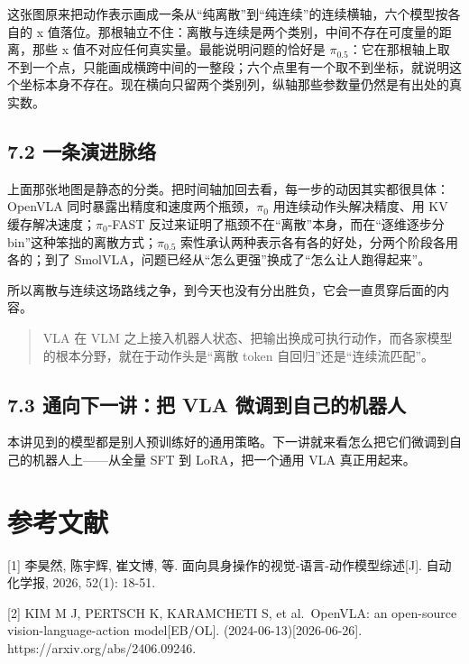 \documentclass[
  chinese,
]{ctexart}
\begin{document}
这张图原来把动作表示画成一条从``纯离散''到``纯连续''的连续横轴，六个模型按各自的
x
值落位。那根轴立不住：离散与连续是两个类别，中间不存在可度量的距离，那些
x 值不对应任何真实量。最能说明问题的恰好是
\(\pi_{0.5}\)：它在那根轴上取不到一个点，只能画成横跨中间的一整段；六个点里有一个取不到坐标，就说明这个坐标本身不存在。现在横向只留两个类别列，纵轴那些参数量仍然是有出处的真实数。

\subsection{7.2
一条演进脉络}\label{ux4e00ux6761ux6f14ux8fdbux8109ux7edc}

上面那张地图是静态的分类。把时间轴加回去看，每一步的动因其实都很具体：OpenVLA
同时暴露出精度和速度两个瓶颈，\(\pi_0\) 用连续动作头解决精度、用 KV
缓存解决速度；\(\pi_0\)-FAST
反过来证明了瓶颈不在``离散''本身，而在``逐维逐步分
bin''这种笨拙的离散方式；\(\pi_{0.5}\)
索性承认两种表示各有各的好处，分两个阶段各用各的；到了
SmolVLA，问题已经从``怎么更强''换成了``怎么让人跑得起来''。

所以离散与连续这场路线之争，到今天也没有分出胜负，它会一直贯穿后面的内容。

\begin{quote}
VLA 在 VLM
之上接入机器人状态、把输出换成可执行动作，而各家模型的根本分野，就在于动作头是``离散
token 自回归''还是``连续流匹配''。
\end{quote}

\subsection{7.3 通向下一讲：把 VLA
微调到自己的机器人}\label{ux901aux5411ux4e0bux4e00ux8bb2ux628a-vla-ux5faeux8c03ux5230ux81eaux5df1ux7684ux673aux5668ux4eba}

本讲见到的模型都是别人预训练好的通用策略。下一讲就来看怎么把它们微调到自己的机器人上------从全量
SFT 到 LoRA，把一个通用 VLA 真正用起来。

\section{参考文献}\label{ux53c2ux8003ux6587ux732e}

{[}1{]} 李昊然, 陈宇辉, 崔文博, 等.
面向具身操作的视觉-语言-动作模型综述{[}J{]}. 自动化学报, 2026, 52(1):
18-51.

{[}2{]} KIM M J, PERTSCH K, KARAMCHETI S, et al.~OpenVLA: an open-source
vision-language-action model{[}EB/OL{]}. (2024-06-13){[}2026-06-26{]}.
https://arxiv.org/abs/2406.09246.
\end{document}
